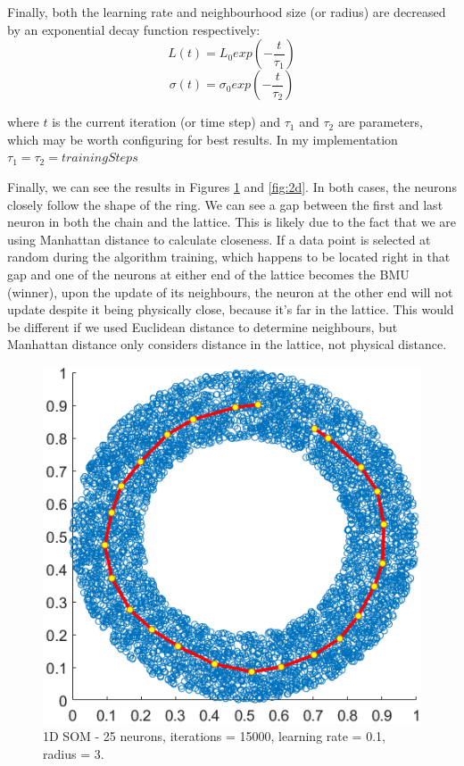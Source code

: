 \documentclass[a4paper,11pt,twocolumn]{article}
\begin{document}
Finally, both the learning rate and neighbourhood size (or radius) are decreased by an exponential decay function respectively:
\[L(t) = L_0exp(-\frac{t}{\tau_1}) \]
\[\sigma(t) = \sigma_0exp(-\frac{t}{\tau_2}) \]

where $t$ is the current iteration (or time step) and $\tau_1$ and $\tau_2$ are parameters, which may be worth configuring for best results. In my implementation $\tau_1 = \tau_2 = trainingSteps$

Finally, we can see the results in Figures \ref{fig:1d} and \ref{fig:2d}. In both cases, the neurons closely follow the shape of the ring. We can see a gap between the first and last neuron in both the chain and the lattice. This is likely due to the fact that we are using Manhattan distance to calculate closeness. If a data point is selected at random during the algorithm training, which happens to be located right in that gap and one of the neurons at either end of the lattice becomes the BMU (winner), upon the update of its neighbours, the neuron at the other end will not update despite it being physically close, because it's far in the lattice. This would be different if we used Euclidean distance to determine neighbours, but Manhattan distance only considers distance in the lattice, not physical distance.

\begin{figure}[!h]
  \centering
  \includegraphics[width=0.8\linewidth]{figures/1d.png}
  \caption{1D SOM - 25 neurons, iterations = 15000, learning rate = 0.1, radius = 3.}
  \label{fig:1d}
\end{figure}
\end{document}

